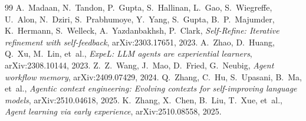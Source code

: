 \documentclass[11pt,a4paper]{article}
\begin{document}
\begin{thebibliography}{99}
 A.~Madaan, N.~Tandon, P.~Gupta, S.~Hallinan, L.~Gao,
S.~Wiegreffe, U.~Alon, N.~Dziri, S.~Prabhumoye, Y.~Yang, S.~Gupta,
B.~P.~Majumder, K.~Hermann, S.~Welleck, A.~Yazdanbakhsh, P.~Clark,
\emph{Self-Refine: Iterative refinement with self-feedback},
arXiv:2303.17651, 2023.
 A.~Zhao, D.~Huang, Q.~Xu, M.~Lin, et~al.,
\emph{ExpeL: LLM agents are experiential learners}, arXiv:2308.10144, 2023.
 Z.~Z.~Wang, J.~Mao, D.~Fried, G.~Neubig,
\emph{Agent workflow memory}, arXiv:2409.07429, 2024.
 Q.~Zhang, C.~Hu, S.~Upasani, B.~Ma, et~al.,
\emph{Agentic context engineering: Evolving contexts for self-improving
language models}, arXiv:2510.04618, 2025.
 K.~Zhang, X.~Chen, B.~Liu, T.~Xue, et~al.,
\emph{Agent learning via early experience}, arXiv:2510.08558, 2025.
\end{thebibliography}
\end{document}
